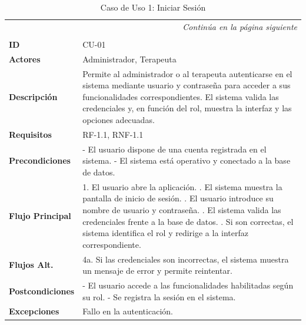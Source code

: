 \clearpage
\begin{longtable}{p{} p{}}
    

    \toprule
    \endfirsthead

    \toprule
    \endhead

    \midrule
    \multicolumn{2}{r}{\small\itshape Continúa en la página siguiente} \\
    \endfoot
    
    \bottomrule
    \noalign{\vspace{0.5cm}} 
    \caption{Caso de Uso 1: Iniciar Sesión} \label{cu:1} \\
    \endlastfoot

    \textbf{ID} & CU-01 \\ \midrule
    \textbf{Actores} & Administrador, Terapeuta \\ \midrule
    \textbf{Descripción} & Permite al administrador o al terapeuta autenticarse en el sistema mediante usuario y contraseña para acceder a sus funcionalidades correspondientes. El sistema valida las credenciales y, en función del rol, muestra la interfaz y las opciones adecuadas. \\ \midrule
    \textbf{Requisitos} & RF-1.1, RNF-1.1 \\ \midrule
    \textbf{Precondiciones} & 
    - El usuario dispone de una cuenta registrada en el sistema. \newline
    - El sistema está operativo y conectado a la base de datos. \\ \midrule
    \textbf{Flujo Principal} & 
    1. El usuario abre la aplicación. \newline
    2. El sistema muestra la pantalla de inicio de sesión. \newline
    3. El usuario introduce su nombre de usuario y contraseña. \newline
    4. El sistema valida las credenciales frente a la base de datos. \newline
    5. Si son correctas, el sistema identifica el rol y redirige a la interfaz correspondiente. \\ \midrule
    \textbf{Flujos Alt.} & 
    4a. Si las credenciales son incorrectas, el sistema muestra un mensaje de error y permite reintentar. \\ \midrule
    \textbf{Postcondiciones} & 
    - El usuario accede a las funcionalidades habilitadas según su rol. \newline
    - Se registra la sesión en el sistema. \\ \midrule
    \textbf{Excepciones} & Fallo en la autenticación. \\
\end{longtable}

